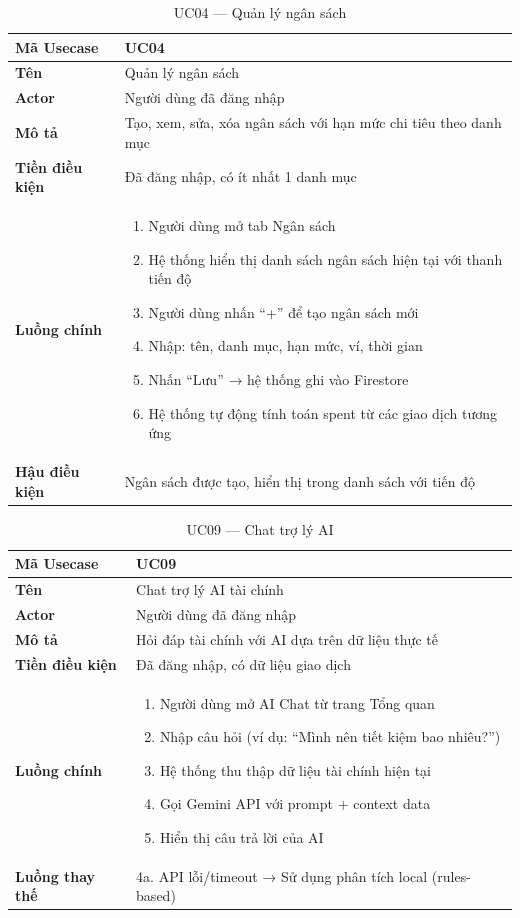 \begin{table}[H]
\centering
\caption{UC04 --- Quản lý ngân sách}
\begin{tabularx}{\textwidth}{|l|X|}
\hline
\textbf{Mã Usecase} & UC04 \\
\hline
\textbf{Tên} & Quản lý ngân sách \\
\hline
\textbf{Actor} & Người dùng đã đăng nhập \\
\hline
\textbf{Mô tả} & Tạo, xem, sửa, xóa ngân sách với hạn mức chi tiêu theo danh mục \\
\hline
\textbf{Tiền điều kiện} & Đã đăng nhập, có ít nhất 1 danh mục \\
\hline
\textbf{Luồng chính} &
\begin{enumerate}[noitemsep,leftmargin=*]
\item Người dùng mở tab Ngân sách
\item Hệ thống hiển thị danh sách ngân sách hiện tại với thanh tiến độ
\item Người dùng nhấn ``+'' để tạo ngân sách mới
\item Nhập: tên, danh mục, hạn mức, ví, thời gian
\item Nhấn ``Lưu'' → hệ thống ghi vào Firestore
\item Hệ thống tự động tính toán spent từ các giao dịch tương ứng
\end{enumerate} \\
\hline
\textbf{Hậu điều kiện} & Ngân sách được tạo, hiển thị trong danh sách với tiến độ \\
\hline
\end{tabularx}
\end{table}

\begin{table}[H]
\centering
\caption{UC09 --- Chat trợ lý AI}
\begin{tabularx}{\textwidth}{|l|X|}
\hline
\textbf{Mã Usecase} & UC09 \\
\hline
\textbf{Tên} & Chat trợ lý AI tài chính \\
\hline
\textbf{Actor} & Người dùng đã đăng nhập \\
\hline
\textbf{Mô tả} & Hỏi đáp tài chính với AI dựa trên dữ liệu thực tế \\
\hline
\textbf{Tiền điều kiện} & Đã đăng nhập, có dữ liệu giao dịch \\
\hline
\textbf{Luồng chính} &
\begin{enumerate}[noitemsep,leftmargin=*]
\item Người dùng mở AI Chat từ trang Tổng quan
\item Nhập câu hỏi (ví dụ: ``Mình nên tiết kiệm bao nhiêu?'')
\item Hệ thống thu thập dữ liệu tài chính hiện tại
\item Gọi Gemini API với prompt + context data
\item Hiển thị câu trả lời của AI
\end{enumerate} \\
\hline
\textbf{Luồng thay thế} & 4a. API lỗi/timeout → Sử dụng phân tích local (rules-based) \\
\hline
\end{tabularx}
\end{table}

